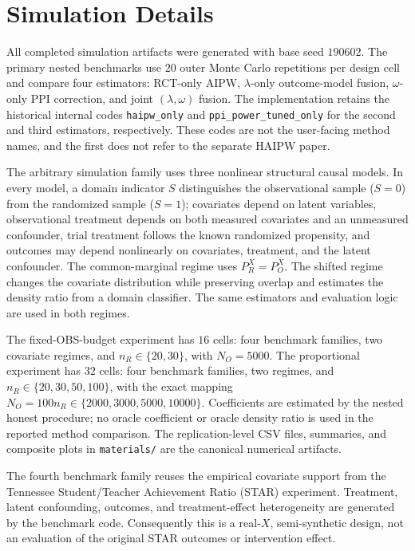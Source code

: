 \section{Simulation Details}
\label{app:simulations}

All completed simulation artifacts were generated with base seed $190602$.  The
primary nested benchmarks use $20$ outer Monte Carlo repetitions per design
cell and compare four estimators: RCT-only AIPW, $\lambda$-only outcome-model
fusion, $\omega$-only PPI correction, and joint $(\lambda,\omega)$ fusion.
The implementation retains the historical internal codes
\texttt{haipw\_only} and \texttt{ppi\_power\_tuned\_only} for the second and
third estimators, respectively.  These codes are not the user-facing method
names, and the first does not refer to the separate HAIPW paper.

The arbitrary simulation family uses three nonlinear structural causal models.
In every model, a domain indicator $S$ distinguishes the observational sample
($S=0$) from the randomized sample ($S=1$); covariates depend on latent
variables, observational treatment depends on both measured covariates and an
unmeasured confounder, trial treatment follows the known randomized propensity,
and outcomes may depend nonlinearly on covariates, treatment, and the latent
confounder.  The common-marginal regime uses $P_R^X=P_O^X$.  The shifted
regime changes the covariate distribution while preserving overlap and estimates
the density ratio from a domain classifier.  The same estimators and evaluation
logic are used in both regimes.

The fixed-OBS-budget experiment has $16$ cells: four benchmark families, two
covariate regimes, and $n_R\in\{20,30\}$, with $N_O=5000$.  The proportional
experiment has $32$ cells: four benchmark families, two regimes, and
$n_R\in\{20,30,50,100\}$, with the exact mapping
$N_O=100n_R\in\{2000,3000,5000,10000\}$.  Coefficients are estimated by the
nested honest procedure; no oracle coefficient or oracle density ratio is used
in the reported method comparison.  The replication-level CSV files, summaries,
and composite plots in \texttt{materials/} are the canonical numerical artifacts.

The fourth benchmark family reuses the empirical covariate support from the
Tennessee Student/Teacher Achievement Ratio (STAR) experiment.  Treatment,
latent confounding, outcomes, and treatment-effect heterogeneity are generated by
the benchmark code.  Consequently this is a real-$X$, semi-synthetic design,
not an evaluation of the original STAR outcomes or intervention effect.

